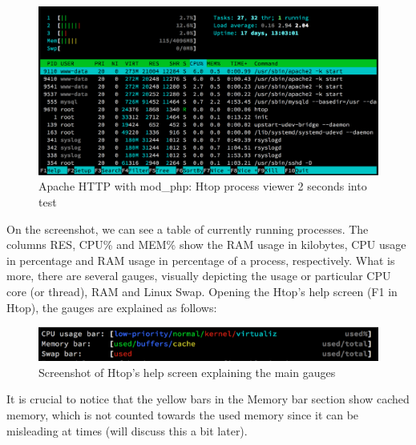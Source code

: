 \begin{figure}[H]
\begin{center}
\includegraphics[scale=0.5]{figures/Apache_mod_php_2s.png}
\caption{Apache HTTP with mod\_php: Htop process viewer 2 seconds into test}
\label{fig:apache_mod_php_2s}
\end{center}
\end{figure}

On the screenshot, we can see a table of currently running processes. The columns RES, CPU\% and MEM\% show the RAM usage in kilobytes, CPU usage in percentage and RAM usage in percentage of a process, respectively. What is more, there are several gauges, visually depicting the usage or particular CPU core (or thread), RAM and Linux Swap. Opening the Htop's help screen (F1 in Htop), the gauges are explained as follows:

\begin{figure}[H]
\begin{center}
\includegraphics{figures/htop_help_gauges.png}
\caption{Screenshot of Htop's help screen explaining the main gauges}
\label{fig:htop_help_gauges}
\end{center}
\end{figure}

It is crucial to notice that the yellow bars in the Memory bar section show cached memory, which is not counted towards the used memory since it can be misleading at times (will discuss this a bit later).

